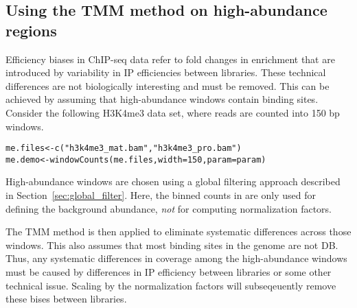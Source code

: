 \documentclass{report}\usepackage[]{graphicx}\usepackage[usenames,dvipsnames]{color}
\newcommand{\hlnum}[1]{\textcolor[rgb]{0.816,0.125,0.439}{#1}}%
\newcommand{\hlstr}[1]{\textcolor[rgb]{0.251,0.627,0.251}{#1}}%
\newcommand{\hlopt}[1]{\textcolor[rgb]{0,0,0}{#1}}%
\newcommand{\hlstd}[1]{\textcolor[rgb]{0.251,0.251,0.251}{#1}}%
\newcommand{\hlkwb}[1]{\textcolor[rgb]{0,0,0}{#1}}%
\newcommand{\hlkwc}[1]{\textcolor[rgb]{0.251,0.251,0.251}{#1}}%
\newcommand{\hlkwd}[1]{\textcolor[rgb]{0.878,0.439,0.125}{#1}}%
\newenvironment{knitrout}{}{} %
\begin{document}
\subsection{Using the TMM method on high-abundance regions}
\label{data:norm}

Efficiency biases in ChIP-seq data refer to fold changes in enrichment that are introduced by variability in IP efficiencies between libraries. 
These technical differences are not biologically interesting and must be removed. 
This can be achieved by assuming that high-abundance windows contain binding sites. 
Consider the following H3K4me3 data set, where reads are counted into 150 bp windows.

\begin{knitrout}
\color{fgcolor}\begin{kframe}
\begin{alltt}
\hlstd{me.files} \hlkwb{<-} \hlkwd{c}\hlstd{(}\hlstr{"h3k4me3_mat.bam"}\hlstd{,} \hlstr{"h3k4me3_pro.bam"}\hlstd{)}
\hlstd{me.demo} \hlkwb{<-} \hlkwd{windowCounts}\hlstd{(me.files,} \hlkwc{width}\hlstd{=}\hlnum{150}\hlstd{,} \hlkwc{param}\hlstd{=param)}
\end{alltt}
\end{kframe}
\end{knitrout}

High-abundance windows are chosen using a global filtering approach described in Section~\ref{sec:global_filter}. 
Here, the binned counts in  are only used for defining the background abundance, \emph{not} for computing normalization factors.

\begin{knitrout}
\color{fgcolor}
\end{knitrout}

The TMM method is then applied to eliminate systematic differences across those windows.
This also assumes that most binding sites in the genome are not DB.
Thus, any systematic differences in coverage among the high-abundance windows must be caused by differences in IP efficiency between libraries or some other technical issue.
Scaling by the normalization factors will subseqeuently remove these bises between libraries. 
\end{document}
